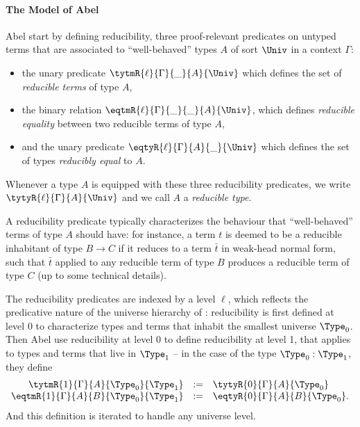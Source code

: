 \paragraph*{The Model of Abel \etal}
% 
Abel \etal start by defining reducibility, three proof-relevant predicates on untyped 
terms that are associated to ``well-behaved'' types \( A \) of sort \( \Univ \) in 
a context \( \Gamma \):
% 
\begin{itemize}
\item the unary predicate \( {\tytmR{\ell}{\Gamma}{\_}{A}{\Univ}} \) which 
  defines the set of \emph{reducible terms} of type \( A \),
\item the binary relation \( {\eqtmR{\ell}{\Gamma}{\_}{\_}{A}{\Univ}} \), 
  which defines \emph{reducible equality} between two reducible terms of type \( A \),
\item and the unary predicate \( {\eqtyR{\ell}{\Gamma}{A}{\_}{\Univ}} \) which 
  defines the set of types \emph{reducibly equal} to \( A \).
\end{itemize}
% 
Whenever a type \( A \) is equipped with these three reducibility predicates, we write 
\( \tytyR{\ell}{\Gamma}{A}{\Univ} \) and we call \( A \) a \emph{reducible type}.

A reducibility predicate typically characterizes the behaviour that ``well-behaved''
terms of type \( A \) should have: for instance, a term \( t \) is deemed
to be a reducible inhabitant of type \( B \to C \) if it reduces to a term 
\( \bar{t} \) in weak-head normal form, such that \( \bar{t} \) applied to
any reducible term of type \( B \) produces a reducible term of type \( C \)
(up to some technical details).

The reducibility predicates are indexed by a level \( \ell \), which reflects 
the predicative nature of the universe hierarchy of \MLTT: reducibility is 
first defined at level $0$ to characterize types and terms that inhabit the 
smallest universe \( \Type_0 \).
% 
Then Abel \etal use reducibility at level 0 to define reducibility at level 1, 
that applies to types and terms that live in \( \Type_1 \) -- in the case of
the type \( \Type_0 : \Type_1 \), they define
\[
\begin{array}{rcl}
  \tytmR{1}{\Gamma}{A}{\Type_0}{\Type_1} & := & \tytyR{0}{\Gamma}{A}{\Type_0} \\
  \eqtmR{1}{\Gamma}{A}{B}{\Type_0}{\Type_1} & := & \eqtyR{0}{\Gamma}{A}{B}{\Type_0}. 
\end{array}
\]
% 
And this definition is iterated to handle any universe level.

